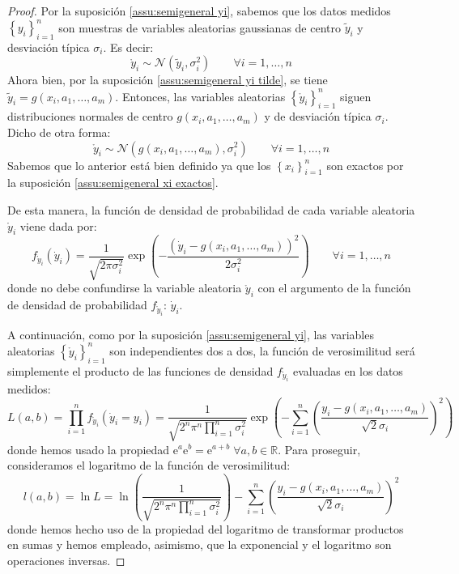 \documentclass[11pt,a4paper,spanish]{article}
\numberwithin{equation}{section}
\numberwithin{table}{section}
\numberwithin{figure}{section}
\theoremstyle{definition}
\theoremstyle{remark}
\theoremstyle{definition}
\theoremstyle{remark}
\theoremstyle{plain}
\theoremstyle{plain}
\theoremstyle{plain}
\theoremstyle{plain}
\theoremstyle{plain}
\theoremstyle{plain}
\begin{document}
	\begin{proof}
		Por la suposición \vref{assu:semigeneral yi}, sabemos que los datos
		medidos $\left\{ y_{i}\right\} _{i=1}^{n}$ son muestras de variables
		aleatorias gaussianas de centro $\tilde{y}_{i}$ y desviación típica
		$\sigma_{i}$. Es decir:
		\[
		\mathring{y}_{i}\sim\mathcal{N}\left(\tilde{y}_{i},\sigma_{i}^{2}\right)\qquad\forall i=1,\dots,n
		\]
		Ahora bien, por la suposición \vref{assu:semigeneral yi tilde}, se
		tiene $\tilde{y}_{i}=g\left(x_{i},a_{1},\dots,a_{m}\right)$. Entonces,
		las variables aleatorias $\left\{ \mathring{y}_{i}\right\} _{i=1}^{n}$
		siguen distribuciones normales de centro $g\left(x_{i},a_{1},\dots,a_{m}\right)$
		y de desviación típica $\sigma_{i}$. Dicho de otra forma:
		\[
		\mathring{y}_{i}\sim\mathcal{N}\left(g\left(x_{i},a_{1},\dots,a_{m}\right),\sigma_{i}^{2}\right)\qquad\forall i=1,\dots,n
		\]
		Sabemos que lo anterior está bien definido ya que los $\left\{ x_{i}\right\} _{i=1}^{n}$
		son exactos por la suposición \vref{assu:semigeneral xi exactos}.
		
		De esta manera, la función de densidad de probabilidad de cada variable
		aleatoria $\mathring{y}_{i}$ viene dada por:
		\[
		f_{\mathring{y}_{i}}\left(\dot{y}_{i}\right)=\frac{1}{\sqrt{2\pi\sigma_{i}^{2}}}\exp\left(-\frac{\left(\dot{y}_{i}-g\left(x_{i},a_{1},\dots,a_{m}\right)\right)^{2}}{2\sigma_{i}^{2}}\right)\qquad\forall i=1,\dots,n
		\]
		donde no debe confundirse la variable aleatoria $\mathring{y}_{i}$
		con el argumento de la función de densidad de probabilidad $f_{\mathring{y}_{i}}$:
		$\dot{y}_{i}$. 
		
		A continuación, como por la suposición \vref{assu:semigeneral yi},
		las variables aleatorias $\left\{ \mathring{y}_{i}\right\} _{i=1}^{n}$
		son independientes dos a dos, la función de verosimilitud será simplemente
		el producto de las funciones de densidad $f_{\mathring{y}_{i}}$ evaluadas
		en los datos medidos:
		\[
		L\left(a,b\right)=\prod_{i=1}^{n}f_{\mathring{y}_{i}}\left(\dot{y}_{i}=y_{i}\right)=\frac{1}{\sqrt{2^{n}\pi^{n}\prod_{i=1}^{n}\sigma_{i}^{2}}}\exp\left(-\sum_{i=1}^{n}\left(\frac{y_{i}-g\left(x_{i},a_{1},\dots,a_{m}\right)}{\sqrt{2}\sigma_{i}}\right)^{2}\right)
		\]
		donde hemos usado la propiedad $\mathrm{e}^{a}\mathrm{e}^{b}=\mathrm{e}^{a+b}\;\forall a,b\in\mathbb{R}$.
		Para proseguir, consideramos el logaritmo de la función de verosimilitud:
		\[
		l\left(a,b\right)=\ln L=\ln\left(\frac{1}{\sqrt{2^{n}\pi^{n}\prod_{i=1}^{n}\sigma_{i}^{2}}}\right)-\sum_{i=1}^{n}\left(\frac{y_{i}-g\left(x_{i},a_{1},\dots,a_{m}\right)}{\sqrt{2}\sigma_{i}}\right)^{2}
		\]
		donde hemos hecho uso de la propiedad del logaritmo de transformar
		productos en sumas y hemos empleado, asimismo, que la exponencial
		y el logaritmo son operaciones inversas.
		

\end{proof}
\end{document}
